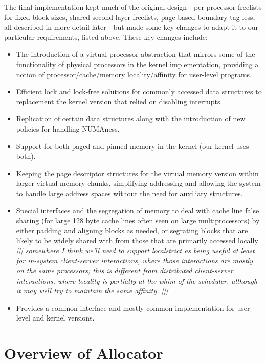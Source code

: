 \documentclass[dvips,11pt]{article}
\newcommand\fixnote[1]{\emph{[[[ #1 ]]]}}
\begin{document}
The final implementation kept much of the original design---per-processor
freelists for fixed block sizes, shared second layer freelists, page-based
boundary-tag-less, all described in more detail later---but made some key
changes to adapt it to our particular requirements, listed above.
These key changes include:
\begin{itemize}
\item The introduction of a virtual processor abstraction that mirrors some
  of the functionality of physical processors in the kernel implementation,
  providing a notion of processor/cache/memory locality/affinity for
  user-level programs.
\item Efficient lock and lock-free solutions for commonly accessed data
  structures to replacement the kernel version that relied on disabling
  interrupts.
\item Replication of certain data structures along with the introduction of 
  new policies for handling NUMAness.
\item Support for both paged and pinned memory in the kernel (our kernel
  uses both).
\item Keeping the page descriptor structures for the virtual memory version 
  within larger virtual memory chunks, simplifying addressing and allowing
  the system to handle large address spaces without the need for auxiliary
  structures.
\item Special interfaces and the segregation of memory to deal with cache
  line false sharing (for large 128 byte cache lines often seen on large
  multiprocessors) by either padding and aligning blocks as needed, or
  segrating blocks that are likely to be widely shared with from those that 
  are primarily accessed locally \fixnote{somewhere I think we'll need to
    support localstrict as being useful at least for in-system
    client-server interactions, where those interactions are mostly on the
    same processors; this is different from distributed client-server
    interactions, where locality is partially at the whim of the scheduler, 
    although it may well try to maintain the same affinity.}
\item Provides a common interface and mostly common implementation for
  user-level and kernel versions.
\end{itemize}



\section{Overview of Allocator}
\end{document}
